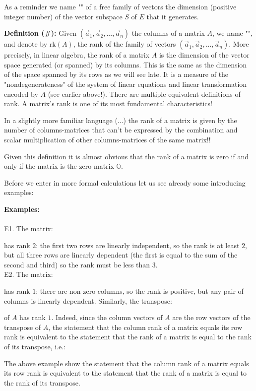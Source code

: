 	As a reminder we name "" of a free family of vectors the dimension (positive integer number) of the vector subspace $S$ of $E$ that it generates.
	
	\textbf{Definition (\#\mydef):} Given $(\vec{a}_1,\vec{a}_2,...,\vec{a}_n)$ the columns of a matrix $A$, we name "", and denote by $\text{rk}(A)$, the rank of the family of vectors $(\vec{a}_1,\vec{a}_2,...,\vec{a}_n)$. More precisely, in linear algebra, the rank of a matrix $A$ is the dimension of the vector space generated (or spanned) by its columns. This is the same as the dimension of the space spanned by its rows as we will see late. It is a measure of the "nondegenerateness" of the system of linear equations and linear transformation encoded by $A$ (see earlier above!). There are multiple equivalent definitions of rank. A matrix's rank is one of its most fundamental characteristics!
	
	In a slightly more familiar language (...) the rank of a matrix is given by the number of columns-matrices that can't be expressed by the combination and scalar multiplication of other columns-matrices of the same matrix!!
	
	Given this definition it is almost obvious that the rank of a matrix is zero if and only if the matrix is the zero matrix $\mathds{O}$.
	
	Before we enter in more formal calculations let us see already some introducing examples:
	\begin{tcolorbox}[colframe=black,colback=white,sharp corners]
	\textbf{{\Large {}}Examples:}\\\\
	E1. The matrix:
	
	has rank $2$: the first two rows are linearly independent, so the rank is at least $2$, but all three rows are linearly dependent (the first is equal to the sum of the second and third) so the rank must be less than $3$.\\
	
	E2. The matrix:
	
	has rank $1$: there are non-zero columns, so the rank is positive, but any pair of columns is linearly dependent. Similarly, the transpose:
	
	of $A$ has rank $1$. Indeed, since the column vectors of $A$ are the row vectors of the transpose of $A$, the statement that the column rank of a matrix equals its row rank is equivalent to the statement that the rank of a matrix is equal to the rank of its transpose, i.e.:
	
	\end{tcolorbox}
	The above example show the statement that the column rank of a matrix equals its row rank is equivalent to the statement that the rank of a matrix is equal to the rank of its transpose.
	
